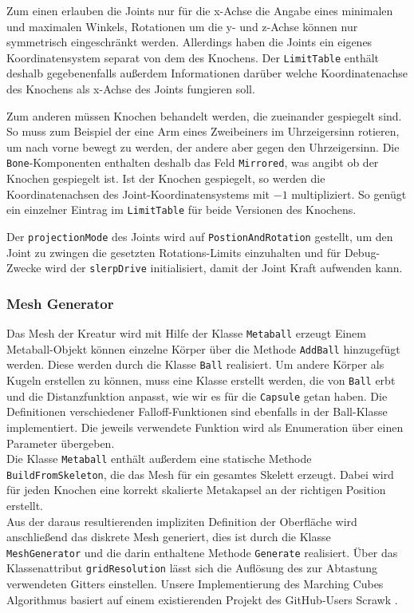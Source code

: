 Zum einen erlauben die Joints nur für die x-Achse die Angabe eines minimalen und maximalen Winkels, Rotationen um die y- und z-Achse können nur symmetrisch eingeschränkt werden.
Allerdings haben die Joints ein eigenes Koordinatensystem separat von dem des Knochens.
Der \texttt{Limit\-Table} enthält deshalb gegebenenfalls außerdem Informationen darüber welche Koordinatenachse des Knochens als x-Achse des Joints fungieren soll.

Zum anderen müssen Knochen behandelt werden, die zueinander gespiegelt sind. So muss zum Beispiel der eine Arm eines Zweibeiners im Uhrzeigersinn rotieren, um nach vorne bewegt zu werden, der andere aber gegen den Uhrzeigersinn. Die \texttt{Bone}-Komponenten enthalten deshalb das Feld \texttt{Mirrored}, was angibt ob der Knochen gespiegelt ist. Ist der Knochen gespiegelt, so werden die Koordinatenachsen des Joint-Koordinatensystems mit \(-1\) multipliziert. So genügt ein einzelner Eintrag im \texttt{Limit\-Table} für beide Versionen des Knochens.

Der \texttt{projectionMode} des Joints wird auf \texttt{Postion\-And\-Rotation} gestellt, um den Joint zu zwingen die gesetzten Rotations-Limits einzuhalten und für Debug-Zwecke wird der \texttt{slerpDrive} initialisiert, damit der Joint Kraft aufwenden kann.

\subsubsection{Mesh Generator}
Das Mesh der Kreatur wird mit Hilfe der Klasse \texttt{Metaball} erzeugt Einem Metaball-Objekt können einzelne Körper über die Methode \texttt{AddBall} hinzugefügt werden. Diese werden durch die Klasse \texttt{Ball} realisiert. Um andere Körper als Kugeln erstellen zu können, muss eine Klasse erstellt werden, die von \texttt{Ball} erbt und die Distanzfunktion anpasst, wie wir es für die \texttt{Capsule} getan haben. Die Definitionen verschiedener Falloff-Funktionen sind ebenfalls in der Ball-Klasse implementiert. Die jeweils verwendete Funktion wird als Enumeration über einen Parameter übergeben.\\
Die Klasse \texttt{Metaball} enthält außerdem eine statische Methode \texttt{BuildFromSkeleton}, die das Mesh für ein gesamtes Skelett erzeugt. Dabei wird für jeden Knochen eine korrekt skalierte Metakapsel an der richtigen Position erstellt.\\
Aus der daraus resultierenden impliziten Definition der Oberfläche wird anschließend das diskrete Mesh generiert, dies ist durch die Klasse \texttt{MeshGenerator} und die darin enthaltene Methode \texttt{Generate} realisiert. Über das Klassenattribut \texttt{gridResolution} lässt sich die Auflösung des zur Abtastung verwendeten Gitters einstellen. Unsere Implementierung des Marching Cubes Algorithmus basiert auf einem existierenden Projekt des GitHub-Users Scrawk \cite{MarchingCubesImplementation} .

